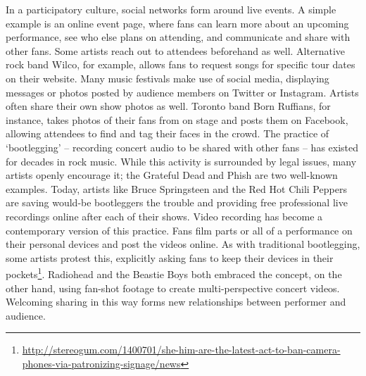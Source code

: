 In a participatory culture, social networks form around live events. A simple example is an online event page, where fans can learn more about an upcoming performance, see who else plans on attending, and communicate and share with other fans. Some artists reach out to attendees beforehand as well. Alternative rock band Wilco, for example, allows fans to request songs for specific tour dates on their website. Many music festivals make use of social media, displaying messages or photos posted by audience members on Twitter or Instagram. Artists often share their own show photos as well. Toronto band Born Ruffians, for instance, takes photos of their fans from on stage and posts them on Facebook, allowing attendees to find and tag their faces in the crowd. The practice of `bootlegging' -- recording concert audio to be shared with other fans -- has existed for decades in rock music. While this activity is surrounded by legal issues, many artists openly encourage it; the Grateful Dead and Phish are two well-known examples. Today, artists like Bruce Springsteen and the Red Hot Chili Peppers are saving would-be bootleggers the trouble and providing free professional live recordings online after each of their shows. Video recording has become a contemporary version of this practice. Fans film parts or all of a performance on their personal devices and post the videos online. As with traditional bootlegging, some artists protest this, explicitly asking fans to keep their devices in their pockets\footnote{\url{http://stereogum.com/1400701/she-him-are-the-latest-act-to-ban-camera-phones-via-patronizing-signage/news}}. Radiohead and the Beastie Boys both embraced the concept, on the other hand, using fan-shot footage to create multi-perspective concert videos. Welcoming sharing in this way forms new relationships between performer and audience.
